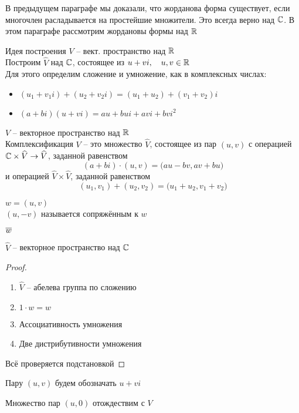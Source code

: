 В предыдущем параграфе мы доказали, что жорданова форма существует, если многочлен расладывается на простейшие множители. Это всегда верно над $ \mathbb{C} $. В этом параграфе рассмотрим жордановы формы над $ \mathbb{R} $

\begin{undefthm}{Идея построения}
	$ V $ -- вект. пространство над $ \mathbb{R} $ \\
	Построим $ \hat{V} $ над $ \mathbb{C} $, состоящее из $ u + vi, \quad u, v \in \mathbb{R} $ \\
	Для этого определим сложение и умножение, как в комплексных числах:
	\begin{itemize}
		\item $ (u_1 + v_1i) + (u_2 + v_2i) = (u_1 + u_2) + (v_1 + v_2)i $
		\item $ (a + bi)(u + vi) = au + bui + avi + bvi^2 $
	\end{itemize}
\end{undefthm}

\begin{definition}
	$ V $ -- векторное пространство над $ \mathbb{R} $ \\
	Комплексификация $ V $ -- это множество $ \hat{V} $, состоящее из пар $ (u, v) $ с операцией $ \mathbb{C} \times \widehat{V} \to \widehat{V} $, заданной равенством
	$$ (a + bi) \cdot (u, v) = \big( au - bv, av + bu \big) $$
	и операцией $ \hat{V} \times \hat{V} $, заданной равенством
	$$ (u_1, v_1) + (u_2, v_2) = \big( u_1 + u_2, v_1 + v_2 \big) $$
\end{definition}

\begin{definition}
	$ w = (u, v) $ \\
	$ (u, -v) $ называется сопряжённым к $ w $
\end{definition}

\begin{notation}
	$ \overline{w} $
\end{notation}

\begin{theorem}
	$ \hat{V} $ -- векторное пространство над $ \mathbb{C} $
\end{theorem}

\begin{proof}
	\hfill
	\begin{enumerate}
		\item $ \hat{V} $ -- абелева группа по сложению
		\item $ 1 \cdot w = w $
		\item Ассоциативность умножения
		\item Две дистрибутивности умножения
	\end{enumerate}
	Всё проверяется подстановкой
\end{proof}

\begin{notation}
	Пару $ (u, v) $ будем обозначать $ u + vi $
\end{notation}

\begin{notation}
	Множество пар $ (u, 0) $ отождествим с $ V $
\end{notation}
